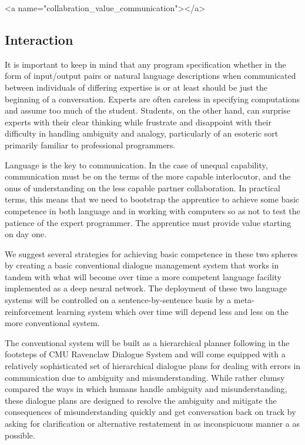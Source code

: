 
\rawhtml
<a name="collabration_value_communication"></a>
\endrawhtml
\subsection*{Interaction}


It is important to keep in mind that any program specification whether in the form of input/output pairs or natural language descriptions when communicated between individuals of differing expertise is \emdash{} or at least should be \emdash{} just the beginning of a conversation. Experts are often careless in specifying computations and assume too much of the student. Students, on the other hand, can surprise experts with their clear thinking while frustrate and disappoint with their difficulty in handling ambiguity and analogy, particularly of an esoteric sort primarily familiar to professional programmers.


Language is the key to communication. In the case of unequal capability, communication must be on the terms of the more capable interlocutor, and the onus of understanding on the less capable partner collaboration. In practical terms, this means that we need to bootstrap the apprentice to achieve some basic competence in both language and in working with computers so as not to test the patience of the expert programmer. The apprentice must provide value starting on day one.

We suggest several strategies for achieving basic competence in these two spheres by creating a basic conventional dialogue management system that works in tandem with what will become over time a more competent language facility implemented as a deep neural network. The deployment of these two language systems will be controlled on a sentence-by-sentence basis by a meta-reinforcement learning system which over time will depend less and less on the more conventional system. 

The conventional system will be built as a hierarchical planner following in the footsteps of CMU Ravenclaw Dialogue System and will come equipped with a relatively sophisticated set of hierarchical dialogue plans for dealing with errors in communication due to ambiguity and misunderstanding. While rather clumsy compared the ways in which humans handle ambiguity and misunderstanding, these dialogue plans are designed to resolve the ambiguity and mitigate the consequences of misunderstanding quickly and get conversation back on track by asking for clarification or alternative restatement in as inconspicuous manner a as possible.

